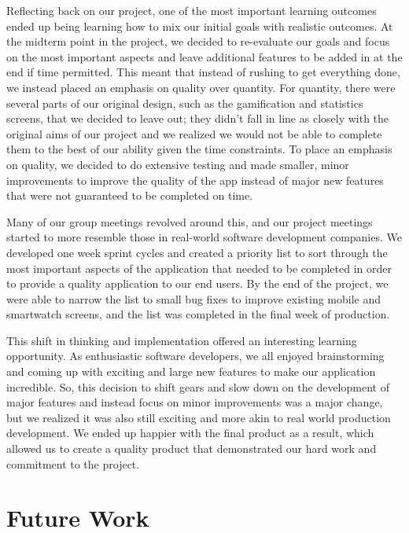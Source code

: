 \documentclass{sigchi}
\begin{document}
Reflecting back on our project, one of the most important learning outcomes
ended up being learning how to mix our initial goals with realistic outcomes.
At the midterm point in the project, we decided to re-evaluate our goals and
focus on the most important aspects and leave additional features to be added
in at the end if time permitted. This meant that instead of rushing to get
everything done, we instead placed an emphasis on quality over quantity. For
quantity, there were several parts of our original design, such as the
gamification and statistics screens, that we decided to leave out; they
didn’t fall in line as closely with the original aims of our project and we
realized we would not be able to complete them to the best of our ability
given the time constraints. To place an emphasis on quality, we decided to do
extensive testing and made smaller, minor improvements to improve the quality
of the app instead of major new features that were not guaranteed to be
completed on time.

Many of our group meetings revolved around this, and our project meetings
started to more resemble those in real-world software development companies. We
developed one week sprint cycles and created a priority list to sort through
the most important aspects of the application that needed to be completed in
order to provide a quality application to our end users. By the end of the
project, we were able to narrow the list to small bug fixes to improve existing
mobile and smartwatch screens, and the list was completed in the final week of
production. 

This shift in thinking and implementation offered an interesting learning
opportunity. As enthusiastic software developers, we all enjoyed brainstorming
and coming up with exciting and large new features to make our application
incredible. So, this decision to shift gears and slow down on the development
of major features and instead focus on minor improvements was a major change,
but we realized it was also still exciting and more akin to real world
production development. We ended up happier with the final product as a result,
which allowed us to create a quality product that demonstrated our hard work
and commitment to the project.


\section{Future Work}

\end{document}
